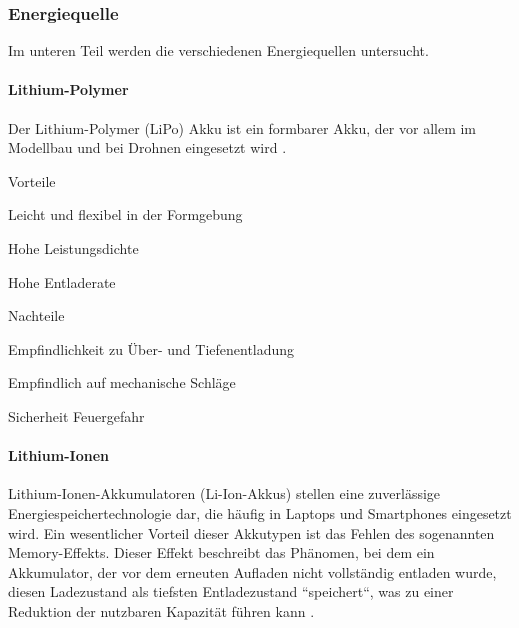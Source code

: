 \documentclass[../main.tex]{subfiles}
\begin{document}
\subsubsection{Energiequelle}

Im unteren Teil werden die verschiedenen Energiequellen untersucht.

\paragraph{Lithium-Polymer}
Der Lithium-Polymer (LiPo) Akku ist ein formbarer Akku, der vor allem im Modellbau und bei Drohnen eingesetzt wird \cite{lipo}.
 

\begin{minipage}[t]{0.48\textwidth}
\begin{items}
  \item [Vorteile]
  \item Leicht und flexibel in der Formgebung
  \item Hohe Leistungsdichte
  \item Hohe Entladerate
\end{items}
\end{minipage}
\hfill
\begin{minipage}[t]{0.48\textwidth}
\begin{items}
  \item [Nachteile]
  \item Empfindlichkeit zu Über- und Tiefenentladung
  \item Empfindlich auf mechanische Schläge
  \item Sicherheit Feuergefahr
\end{items}
\end{minipage}


\paragraph{Lithium-Ionen}

Lithium-Ionen-Akkumulatoren (Li-Ion-Akkus) stellen eine zuverlässige Energiespeichertechnologie dar, die häufig in Laptops und Smartphones eingesetzt wird. Ein wesentlicher Vorteil dieser Akkutypen ist das Fehlen des sogenannten Memory-Effekts. Dieser Effekt beschreibt das Phänomen, bei dem ein Akkumulator, der vor dem erneuten Aufladen nicht vollständig entladen wurde, diesen Ladezustand als tiefsten Entladezustand ``speichert``, was zu einer Reduktion der nutzbaren Kapazität führen kann \cite{li-ion}.
\end{document}
